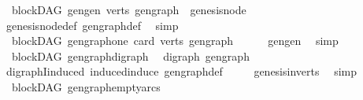\begin{isabellebody}
\isanewline
{}\isamarkupfalse%
\ {\isacharparenleft}{\kern0pt}\ blockDAG{\isacharparenright}{\kern0pt}\ gen{\isacharunderscore}{\kern0pt}gen\ {\isacharcolon}{\kern0pt}{\isachardoublequoteopen}verts\ {\isacharparenleft}{\kern0pt}gen{\isacharunderscore}{\kern0pt}graph{\isacharparenright}{\kern0pt}\ {\isacharequal}{\kern0pt}\ {\isacharbraceleft}{\kern0pt}genesis{\isacharunderscore}{\kern0pt}node{\isacharbraceright}{\kern0pt}{\isachardoublequoteclose}\ \isanewline
%
\isadelimproof
\ \ %
\endisadelimproof
%
\isatagproof
{}\isamarkupfalse%
\ genesis{\isacharunderscore}{\kern0pt}node{\isacharunderscore}{\kern0pt}def\ gen{\isacharunderscore}{\kern0pt}graph{\isacharunderscore}{\kern0pt}def\ \isamarkupfalse%
\ simp%
\endisatagproof
{\isafoldproof}%
%
\isadelimproof
\isanewline
%
\endisadelimproof
\isanewline
{}\isamarkupfalse%
\ {\isacharparenleft}{\kern0pt}\ blockDAG{\isacharparenright}{\kern0pt}\ gen{\isacharunderscore}{\kern0pt}graph{\isacharunderscore}{\kern0pt}one{\isacharcolon}{\kern0pt}\ {\isachardoublequoteopen}card\ {\isacharparenleft}{\kern0pt}verts\ gen{\isacharunderscore}{\kern0pt}graph{\isacharparenright}{\kern0pt}\ {\isacharequal}{\kern0pt}\ {}\ {\isachardoublequoteclose}%
\isadelimproof
\ %
\endisadelimproof
%
\isatagproof
{}\isamarkupfalse%
\ gen{\isacharunderscore}{\kern0pt}gen\ \isamarkupfalse%
\ simp%
\endisatagproof
{\isafoldproof}%
%
\isadelimproof
%
\endisadelimproof
\isanewline
\isanewline
{}\isamarkupfalse%
\ {\isacharparenleft}{\kern0pt}\ blockDAG{\isacharparenright}{\kern0pt}\ gen{\isacharunderscore}{\kern0pt}graph{\isacharunderscore}{\kern0pt}digraph{\isacharcolon}{\kern0pt}\isanewline
\ \ {\isachardoublequoteopen}digraph\ gen{\isacharunderscore}{\kern0pt}graph{\isachardoublequoteclose}\isanewline
%
\isadelimproof
\ \ %
\endisadelimproof
%
\isatagproof
{}\isamarkupfalse%
\ digraphI{\isacharunderscore}{\kern0pt}induced\ induced{\isacharunderscore}{\kern0pt}induce\ gen{\isacharunderscore}{\kern0pt}graph{\isacharunderscore}{\kern0pt}def\ \isanewline
\ \ \ \ genesis{\isacharunderscore}{\kern0pt}in{\isacharunderscore}{\kern0pt}verts\ \isamarkupfalse%
\ simp%
\endisatagproof
{\isafoldproof}%
%
\isadelimproof
\ \ \isanewline
%
\endisadelimproof
\isanewline
{}\isamarkupfalse%
\ {\isacharparenleft}{\kern0pt}\ blockDAG{\isacharparenright}{\kern0pt}\ gen{\isacharunderscore}{\kern0pt}graph{\isacharunderscore}{\kern0pt}empty{\isacharunderscore}{\kern0pt}arcs{\isacharcolon}{\kern0pt}\ \isanewline

\end{isabellebody}
